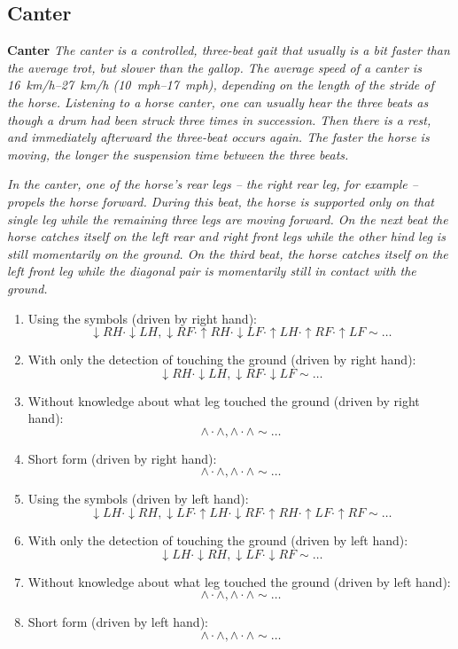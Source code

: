 \subsection{Canter}
\begin{definition}{\textbf{Canter}}
    \label{def:canter}
    \textit{The canter is a controlled, three-beat gait that usually is a bit faster than the average trot, but slower than the gallop. The average speed of a canter is \SIrange{16}{27}{km/h} (\SIrange{10}{17}{mph}), depending on the length of the stride of the horse. Listening to a horse canter, one can usually hear the three beats as though a drum had been struck three times in succession. Then there is a rest, and immediately afterward the three-beat occurs again. The faster the horse is moving, the longer the suspension time between the three beats.}
    
    \textit{In the canter, one of the horse's rear legs -- the right rear leg, for example -- propels the horse forward. During this beat, the horse is supported only on that single leg while the remaining three legs are moving forward. On the next beat the horse catches itself on the left rear and right front legs while the other hind leg is still momentarily on the ground. On the third beat, the horse catches itself on the left front leg while the diagonal pair is momentarily still in contact with the ground.} \cite{Harrisc1993}
    
    \begin{enumerate}
        \item Using the symbols (driven by right hand):
        $$ \downarrow RH \cdot \downarrow LH, \downarrow RF \cdot \uparrow RH \cdot \downarrow LF \cdot \uparrow LH \cdot \uparrow RF \cdot \uparrow LF \sim \dots $$
        \item With only the detection of touching the ground (driven by right hand):
        $$ \downarrow RH \cdot \downarrow LH, \downarrow RF \cdot \downarrow LF \sim \dots $$
        \item Without knowledge about what leg touched the ground (driven by right hand):
        $$ \wedge \cdot \wedge, \wedge \cdot \wedge \sim \dots $$
        \item Short form (driven by right hand):
        $$ \wedge \cdot \wedge, \wedge \cdot \wedge \sim \dots $$
        \item Using the symbols (driven by left hand):
        $$ \downarrow LH \cdot \downarrow RH, \downarrow LF \cdot \uparrow LH \cdot \downarrow RF \cdot \uparrow RH \cdot \uparrow LF \cdot \uparrow RF \sim \dots $$
        \item With only the detection of touching the ground (driven by left hand):
        $$ \downarrow LH \cdot \downarrow RH, \downarrow LF \cdot \downarrow RF \sim \dots $$
        \item Without knowledge about what leg touched the ground (driven by left hand):
        $$ \wedge \cdot \wedge, \wedge \cdot \wedge \sim \dots $$
        \item Short form (driven by left hand):
        $$ \wedge \cdot \wedge, \wedge \cdot \wedge \sim \dots $$
    \end{enumerate}
\end{definition}

